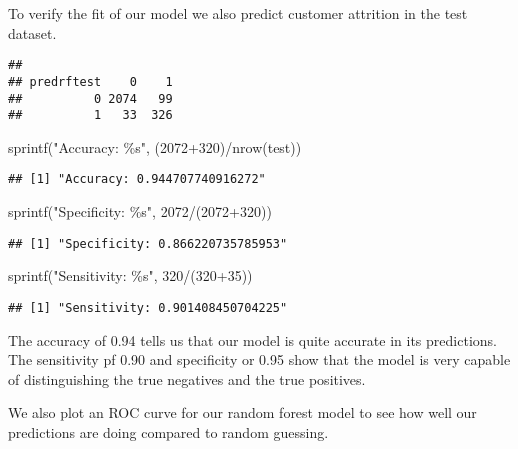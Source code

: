 \documentclass[
]{article}
\newenvironment{Shaded}{\begin{snugshade}}{\end{snugshade}}
\newcommand{\DecValTok}[1]{\textcolor[rgb]{0.00,0.00,0.81}{#1}}
\newcommand{\FunctionTok}[1]{\textcolor[rgb]{0.00,0.00,0.00}{#1}}
\newcommand{\NormalTok}[1]{#1}
\newcommand{\SpecialCharTok}[1]{\textcolor[rgb]{0.00,0.00,0.00}{#1}}
\newcommand{\StringTok}[1]{\textcolor[rgb]{0.31,0.60,0.02}{#1}}
\begin{document}
To verify the fit of our model we also predict customer attrition in the
test dataset.

\begin{verbatim}
##           
## predrftest    0    1
##          0 2074   99
##          1   33  326
\end{verbatim}

\begin{Shaded}
\begin{Highlighting}[]
\FunctionTok{sprintf}\NormalTok{(}\StringTok{"Accuracy: \%s"}\NormalTok{, (}\DecValTok{2072}\SpecialCharTok{+}\DecValTok{320}\NormalTok{)}\SpecialCharTok{/}\FunctionTok{nrow}\NormalTok{(test))}
\end{Highlighting}
\end{Shaded}

\begin{verbatim}
## [1] "Accuracy: 0.944707740916272"
\end{verbatim}

\begin{Shaded}
\begin{Highlighting}[]
\FunctionTok{sprintf}\NormalTok{(}\StringTok{"Specificity: \%s"}\NormalTok{, }\DecValTok{2072}\SpecialCharTok{/}\NormalTok{(}\DecValTok{2072}\SpecialCharTok{+}\DecValTok{320}\NormalTok{))}
\end{Highlighting}
\end{Shaded}

\begin{verbatim}
## [1] "Specificity: 0.866220735785953"
\end{verbatim}

\begin{Shaded}
\begin{Highlighting}[]
\FunctionTok{sprintf}\NormalTok{(}\StringTok{"Sensitivity: \%s"}\NormalTok{, }\DecValTok{320}\SpecialCharTok{/}\NormalTok{(}\DecValTok{320}\SpecialCharTok{+}\DecValTok{35}\NormalTok{))}
\end{Highlighting}
\end{Shaded}

\begin{verbatim}
## [1] "Sensitivity: 0.901408450704225"
\end{verbatim}

The accuracy of 0.94 tells us that our model is quite accurate in its
predictions. The sensitivity pf 0.90 and specificity or 0.95 show that
the model is very capable of distinguishing the true negatives and the
true positives.

We also plot an ROC curve for our random forest model to see how well
our predictions are doing compared to random guessing.
\end{document}
